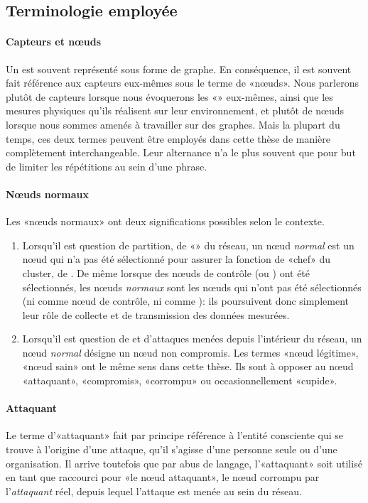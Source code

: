     \subsection{Terminologie employée}
            \paragraph{Capteurs et nœuds}
Un \rcsf est souvent représenté sous forme de graphe.
En conséquence, il est souvent fait référence aux capteurs eux-mêmes sous le terme de «nœuds».
Nous parlerons plutôt de capteurs lorsque nous évoquerons les «\rcs» eux-mêmes, ainsi que les mesures physiques qu'ils réalisent sur leur environnement, et plutôt de nœuds lorsque nous sommes amenés à travailler sur des graphes.
Mais la plupart du temps, ces deux termes peuvent être employés dans cette thèse de manière complètement interchangeable.
Leur alternance n'a le plus souvent que pour but de limiter les répétitions au sein d'une phrase.

            \paragraph{Nœuds normaux}
Les «nœuds normaux» ont deux significations possibles selon le contexte.
\begin{enumerate}
    \item Lorsqu'il est question de partition, de «» du réseau, un nœud \textit{normal} est un nœud qui n'a pas été sélectionné pour assurer la fonction de «chef» du cluster, de \ch. De même lorsque des nœuds de contrôle (\cns ou \vns) ont été sélectionnés, les nœuds \textit{normaux} sont les nœuds qui n'ont pas été sélectionnés (ni comme nœud de contrôle, ni comme \ch): ils poursuivent donc simplement leur rôle de collecte et de transmission des données mesurées.
    \item Lorsqu'il est question de \secu et d'attaques menées depuis l'intérieur du réseau, un nœud \textit{normal} désigne un nœud non compromis. Les termes «nœud légitime», «nœud sain» ont le même sens dans cette thèse. Ils sont à opposer au nœud «attaquant», «compromis», «corrompu» ou occasionnellement «cupide».
\end{enumerate}

            \paragraph{Attaquant}
Le terme d'«attaquant» fait par principe référence à l'entité consciente qui se trouve à l'origine d'une attaque, qu'il s'agisse d'une personne seule ou d'une organisation.
Il arrive toutefois que par abus de langage, l'«attaquant» soit utilisé en tant que raccourci pour «le nœud attaquant», \cad le nœud corrompu par l'\textit{attaquant} réel, depuis lequel l'attaque est menée au sein du réseau.

